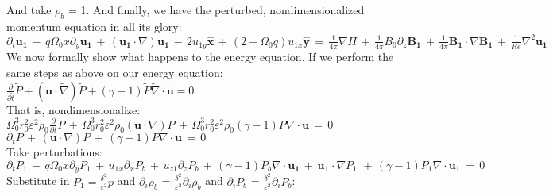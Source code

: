\documentclass[letterpaper,12pt]{article}
\newcommand\reye{\mathrel{Re}}
\begin{document}
And take $\rho_b$ = 1. And finally, we have the perturbed, nondimensionalized momentum equation in all its glory: \\

$\partial_t \mathbf{u_1} \, - \, q\Omega_0 x \partial_y \mathbf{u_1} \, + \, \left(\mathbf{u_1}\cdot \nabla\right) \mathbf{u_1} \, - \, 2 u_{1y} \mathbf{\hat{x}} \, + \, \left(2 - \Omega_0 q\right)u_{1x}\mathbf{\hat{y}} \, = \, \frac{1}{4\pi} \nabla \Pi \, + \, \frac{1}{4\pi}B_0\partial_z\mathbf{B_1} \, + \, \frac{1}{4\pi}\mathbf{B_1} \cdot \nabla \mathbf{B_1} \,+ \, \frac{1}{\reye}\nabla^2 \mathbf{u_1}$ \\

We now formally show what happens to the energy equation. If we perform the same steps as above on our energy equation: \\

$\frac{\partial}{\partial\widetilde{t}} \widetilde{P} + \left(\widetilde{\mathbf{u}} \cdot \widetilde{\nabla} \right)\widetilde{P} + \left(\gamma -1\right)\widetilde{P} \widetilde{\nabla} \cdot \widetilde{\mathbf{u}} = 0$ \\

That is, nondimensionalize: \\

$\Omega_0^3 r_0^2 \varepsilon^2 \rho_0 \frac{\partial}{\partial t} P \, + \, \Omega_0^3 r_0^2 \varepsilon^2 \rho_0 \left(\mathbf{u} \cdot \nabla \right) P \, + \, \Omega_0^3 r_0^2 \varepsilon^2 \rho_0 \left(\gamma - 1 \right) P \nabla \cdot \mathbf{u} \, = \, 0 $ \\

$\partial_t P \, + \, \left(\mathbf{u} \cdot \nabla \right) P \, + \, \left(\gamma - 1 \right) P \nabla \cdot \mathbf{u} \, = \, 0 $ \\

Take perturbations: \\

$\partial_t P_1 \, - \, q\Omega_0 x \partial_y P_1 \, + \, u_{1x}\partial_x P_b \, + \, u_{z1}\partial_z P_b \, + \, \left(\gamma - 1 \right) P_b \nabla \cdot \mathbf{u_1} \, + \, \mathbf{u_1} \cdot \nabla P_1 \, \, + \, \left(\gamma - 1\right)P_1 \nabla \cdot \mathbf{u_1} \, = \, 0$ \\

Substitute in $P_1 = \frac{\delta^2}{\varepsilon^2} p$ and $\partial_i \rho_b$ = $\frac{\delta^2}{\varepsilon^2} \partial_i \rho_b$ and $\partial_i P_b$ = $\frac{\delta^2}{\varepsilon^2} \partial_i P_b$: \\
\end{document}
